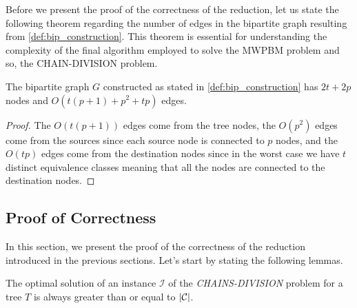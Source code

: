 Before we present the proof of the correctness of the reduction, let us state the following theorem regarding the number of edges in the bipartite graph resulting from \cref{def:bip_construction}. This theorem is essential for understanding the complexity of the final algorithm employed to solve the \textsc{MWPBM} problem and so, the \textsc{CHAIN-DIVISION} problem.

\begin{theorem}
    The bipartite graph $G$ constructed as stated in \cref{def:bip_construction} has $2t + 2p$ nodes and $O(t (p + 1) + p^2 + tp)$ edges.
\end{theorem}

\begin{proof}
    The $O(t (p + 1))$ edges come from the tree nodes, the $O(p^2)$ edges come from the sources since each source node is connected to $p$ nodes, and the $O(tp)$ edges come from the destination nodes since in the worst case we have $t$ distinct equivalence classes meaning that all the nodes are connected to the destination nodes. 
\end{proof}

\subsection{Proof of Correctness}
In this section, we present the proof of the correctness of the reduction introduced in the previous sections. Let's start by stating the following lemmas.

\begin{comment}
\begin{lemma} \label{lemma:all_destinations}
    Exactly $|\equivset|$ nodes of the set $\treeset{1}$ are connected to all the destination nodes $d_i \in \destset$ with weight $0$.
\end{lemma}

\begin{proof}
    As outlined in \cref{def:bip_construction}, the destination nodes $d_i \in V_2$ are connected to nodes $u_i \in \treeset{1}$ with weight $0$ iff for all $v_j \in \treeset{2}$ such that $j > i$, $\equivsetfunc{v_j} \neq \equivsetfunc{u_i}$, i.e. $u_i$ is the last of its class in the ordering. Consequently, there are exactly $|\equivset|$ nodes in $\treeset{1}$ that are last representatives of their class in the ordering.
\end{proof}
\end{comment}

\begin{lemma} \label{lemma:optimal_cost}
    The optimal solution of an instance $\mathcal{I}$ of the \textit{CHAINS-DIVISION} problem for a tree $T$ is always greater than or equal to $|\mathcal{C}|$.
\end{lemma}

